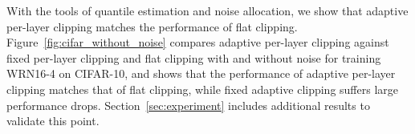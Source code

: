 














    
    











With the tools of quantile estimation and noise allocation, we show that adaptive per-layer clipping matches the performance of flat clipping. 
Figure~\ref{fig:cifar_without_noise} compares adaptive per-layer clipping against fixed per-layer clipping and flat clipping with and without noise for training WRN16-4 on CIFAR-10, and
shows that the performance of adaptive per-layer clipping matches that of flat clipping, while fixed adaptive clipping suffers large performance drops.
Section~\ref{sec:experiment} includes additional results to validate this point.



